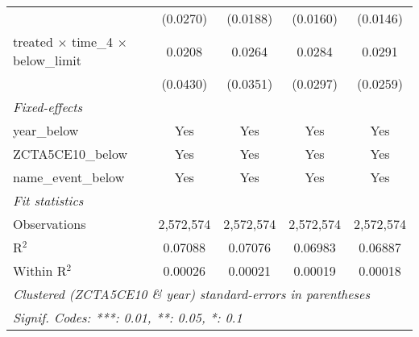 \begin{tabular}{lcccc}
                                                       & (0.0270)        & (0.0188)        & (0.0160)        & (0.0146)\\   
   treated $\times$ time\_4 $\times$ below\_limit      & 0.0208          & 0.0264          & 0.0284          & 0.0291\\   
                                                       & (0.0430)        & (0.0351)        & (0.0297)        & (0.0259)\\   
   \midrule
   \emph{Fixed-effects}\\
   year\_below                                         & Yes             & Yes             & Yes             & Yes\\  
   ZCTA5CE10\_below                                    & Yes             & Yes             & Yes             & Yes\\  
   name\_event\_below                                  & Yes             & Yes             & Yes             & Yes\\  
   \midrule
   \emph{Fit statistics}\\
   Observations                                        & 2,572,574       & 2,572,574       & 2,572,574       & 2,572,574\\  
   R$^2$                                               & 0.07088         & 0.07076         & 0.06983         & 0.06887\\  
   Within R$^2$                                        & 0.00026         & 0.00021         & 0.00019         & 0.00018\\  
   \midrule \midrule
   \multicolumn{5}{l}{\emph{Clustered (ZCTA5CE10 \& year) standard-errors in parentheses}}\\
   \multicolumn{5}{l}{\emph{Signif. Codes: ***: 0.01, **: 0.05, *: 0.1}}\\
\end{tabular}
\par\endgroup
